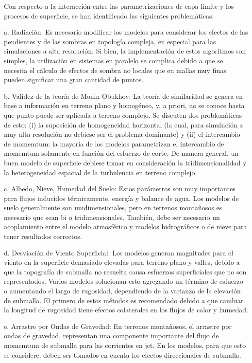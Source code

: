 Con respecto a la interacción entre las parametrizaciones de capa límite y los procesos de superficie, se han identificado las siguientes problemáticas:
\begin{enumerate*}
	\item[a.] Radiación: Es necesario modificar los modelos para considerar los efectos de las pendientes y de las sombras en topología compleja, en especial para las simulaciones a alta resolución. Si bien, la implementación de estos algoritmos son simples, la utilización en sistemas en paralelo se complica debido a que se necesita el cálculo de efectos de sombra no locales que en mallas muy finas pueden significar una gran cantidad de puntos.
	\item[b.] Validez de la teoría de Monin-Obukhov: La teoría de similaridad se genera en base a información en terreno plano y homogéneo, y, a priori, no se conoce hasta que punto puede ser aplicada a terreno complejo. Se discuten dos problemáticas de esto: (i) la suposición de homogeneidad horizontal (la cual, para simulación a muy alta resolución no debiese ser el problema dominante) y (ii) el intercambio de momemtum: la mayoría de los modelos parametrizan el intercambio de momemtum solamente en función del esfuerzo de corte. De manera general, un buen modelo de superficie debiese tomar en consideración la tridimensionalidad y la heterogeneidad espacial de la turbulencia en terreno complejo.
	\item[c.] Albedo, Nieve, Humedad del Suelo: Estos parámetros son muy importantes para flujos inducidos térmicamente, energía y balance de agua. Los modelos de suelo generalmente son unidimensionales, pero en terrenos montañosos es necesario  que sean bi o tridimensionales. También, debe ser necesario un acoplamiento entre el modelo atmosférico  y modelos hidrográficos o de nieve para tener resultados correctos. 
	\item[d.] Desviación de Viento Superficial: Los modelos generan magnitudes para el viento en la superficie demasiado elevadas para terreno plano y valles, debido a que la topografía de submalla no resuelta causa esfuerzos superficiales que no son representados. Varios modelos solucionan esto agregando un término de esfuerzo o aumentando el largo de rugosidad, dependiendo de la varianza de la elevación de submalla. El primero de estos métodos es recomendado debido a que cambiar la longitud de rugosidad tiene efectos colaterales en los flujos de calor y humedad.
	\item[e.] Arrastre por Ondas de Gravedad: En terrenos montañosos, el arrastre por ondas de gravedad, representan una componente importante del flujo de momemtum de submalla para las corrientes en jet. En los modelos, para que esto se considere, deben ser tomados en cuenta los efectos direccionales de submalla.
\end{enumerate*}

